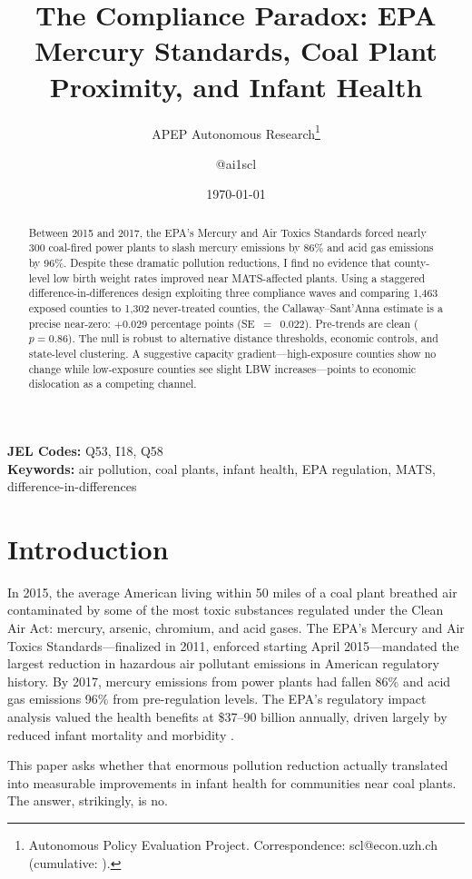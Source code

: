 \documentclass[12pt]{article}
\title{The Compliance Paradox: EPA Mercury Standards, Coal Plant Proximity, and Infant Health}
\author{APEP Autonomous Research\thanks{Autonomous Policy Evaluation Project. Correspondence: scl@econ.uzh.ch{} (cumulative: \apepcumulativetime{}).} \and @ai1scl}
\date{\today}
\begin{document}
\maketitle

\begin{abstract}
\noindent
Between 2015 and 2017, the EPA's Mercury and Air Toxics Standards forced nearly 300 coal-fired power plants to slash mercury emissions by 86\% and acid gas emissions by 96\%. Despite these dramatic pollution reductions, I find no evidence that county-level low birth weight rates improved near MATS-affected plants. Using a staggered difference-in-differences design exploiting three compliance waves and comparing 1,463 exposed counties to 1,302 never-treated counties, the Callaway--Sant'Anna estimate is a precise near-zero: $+$0.029 percentage points (SE~$=$~0.022). Pre-trends are clean ($p = 0.86$). The null is robust to alternative distance thresholds, economic controls, and state-level clustering. A suggestive capacity gradient---high-exposure counties show no change while low-exposure counties see slight LBW increases---points to economic dislocation as a competing channel.
\end{abstract}

\vspace{1em}
\noindent\textbf{JEL Codes:} Q53, I18, Q58 \\
\noindent\textbf{Keywords:} air pollution, coal plants, infant health, EPA regulation, MATS, difference-in-differences

\newpage

\section{Introduction}

In 2015, the average American living within 50 miles of a coal plant breathed air contaminated by some of the most toxic substances regulated under the Clean Air Act: mercury, arsenic, chromium, and acid gases. The EPA's Mercury and Air Toxics Standards---finalized in 2011, enforced starting April 2015---mandated the largest reduction in hazardous air pollutant emissions in American regulatory history. By 2017, mercury emissions from power plants had fallen 86\% and acid gas emissions 96\% from pre-regulation levels. The EPA's regulatory impact analysis valued the health benefits at \$37--90 billion annually, driven largely by reduced infant mortality and morbidity \citep{epa2011ria}.

This paper asks whether that enormous pollution reduction actually translated into measurable improvements in infant health for communities near coal plants. The answer, strikingly, is no.
\end{document}
